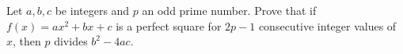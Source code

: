 Let $a, b, c$ be integers and $p$ an odd prime number. Prove that if $f(x) = ax^2 + bx + c$ is a perfect square for $2p - 1$ consecutive integer values of $x$, then $p$ divides $b^2 - 4ac$.
